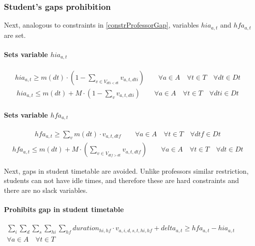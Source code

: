 \subsubsection{Student's gaps prohibition}
\label{constrStudentGap}

Next, analogous to constraints in \ref{constrProfessorGap}, variables $hia_{a,t}$ and $hfa_{a,t}$ are set.

\paragraph{Sets variable $hia_{a,t}$}
\begin{eqnarray}
hia_{a,t} \geq m(dt) \cdot ( 1 - \sum\limits_{v \in V_{dti<dt}} v_{a,t,dti} ) \nonumber \qquad
\forall a \in A \quad
\forall t \in T \quad
\forall dt \in Dt
\end{eqnarray}
\begin{eqnarray}
hia_{a,t} \leq m(dt) + M \cdot ( 1 - \sum\limits_{v} v_{a,t,dti} ) \nonumber \qquad
\forall a \in A \quad
\forall t \in T \quad
\forall dti \in Dt
\end{eqnarray}

\paragraph{Sets variable $hfa_{a,t}$}
\begin{eqnarray}
hfa_{a,t} \geq \sum\limits_{v} m(dt) \cdot v_{a,t,dtf} \nonumber \qquad
\forall a \in A \quad
\forall t \in T \quad
\forall dtf \in Dt
\end{eqnarray}
\begin{eqnarray}
hfa_{a,t} \leq m(dt) + M \cdot ( \sum\limits_{v \in V_{dtf>dt}} v_{a,t,dtf} ) \nonumber \qquad
\forall a \in A \quad
\forall t \in T \quad
\forall dt \in Dt
\end{eqnarray}

Next, gaps in student timetable are avoided. Unlike professors similar restriction, students can not have idle times, and therefore these are hard constraints and there are no slack variables.

\paragraph{Prohibits gap in student timetable}
\begin{eqnarray}
\sum\limits_{i} \sum\limits_{d} \sum\limits_{s} \sum\limits_{hi} \sum\limits_{hf} duration_{hi,hf} \cdot v_{a,i,d,s,t,hi,hf} + delta_{a,t} \geq hfa_{a,t} - hia_{a,t} \nonumber \qquad
\\
\forall a \in A \quad
\forall t \in T \quad
\end{eqnarray}





